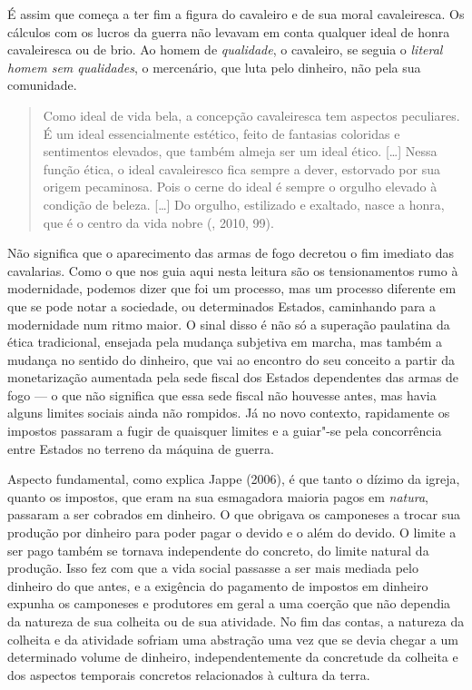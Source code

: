 É assim que começa a ter fim a figura do cavaleiro e de sua moral
cavaleiresca. Os cálculos com os lucros da guerra não levavam em conta
qualquer ideal de honra cavaleiresca ou de brio. Ao homem de
\emph{qualidade}, o cavaleiro, se seguia o \emph{literal homem sem
qualidades}, o mercenário, que luta pelo dinheiro, não pela sua
comunidade.

\begin{quote}
Como ideal de vida bela, a concepção cavaleiresca tem aspectos
peculiares. É um ideal essencialmente estético, feito de fantasias
coloridas e sentimentos elevados, que também almeja ser um ideal ético.
[\ldots{}] Nessa função ética, o ideal cavaleiresco fica sempre a
dever, estorvado por sua origem pecaminosa. Pois o cerne do ideal é
sempre o orgulho elevado à condição de beleza. [\ldots{}] Do
orgulho, estilizado e exaltado, nasce a honra, que é o centro da vida
nobre (, 2010, 99).
\end{quote}

Não significa que o aparecimento das armas de fogo decretou o fim
imediato das cavalarias. Como o que nos guia aqui nesta leitura são os tensionamentos
rumo à modernidade, podemos dizer que foi um processo, mas um processo
diferente em que se pode notar a sociedade, ou determinados Estados,
caminhando para a modernidade num ritmo maior. O sinal disso é não só a
superação paulatina da ética tradicional, ensejada pela mudança
subjetiva em marcha, mas também a mudança no sentido do dinheiro, que
vai ao encontro do seu conceito a partir da monetarização aumentada pela
sede fiscal dos Estados dependentes das armas de fogo --- o que não
significa que essa sede fiscal não houvesse antes, mas havia alguns
limites sociais ainda não rompidos. Já no novo contexto, rapidamente os
impostos passaram a fugir de quaisquer limites e a guiar"-se pela
concorrência entre Estados no terreno da máquina de guerra.

Aspecto fundamental, como explica Jappe (2006), é que tanto o dízimo da
igreja, quanto os impostos, que eram na sua esmagadora maioria pagos em
\emph{natura}, passaram a ser cobrados em dinheiro. O que obrigava os
camponeses a trocar sua produção por dinheiro para poder pagar o devido
e o além do devido. O limite a ser pago também se tornava independente
do concreto, do limite natural da produção. Isso fez com que a vida
social passasse a ser mais mediada pelo dinheiro do que antes, e a
exigência do pagamento de impostos em dinheiro expunha os camponeses e
produtores em geral a uma coerção que não dependia da natureza de sua
colheita ou de sua atividade. No fim das contas, a natureza da colheita
e da atividade sofriam uma abstração uma vez que se devia chegar a um
determinado volume de dinheiro, independentemente da concretude da
colheita e dos aspectos temporais concretos relacionados à cultura da
terra.

